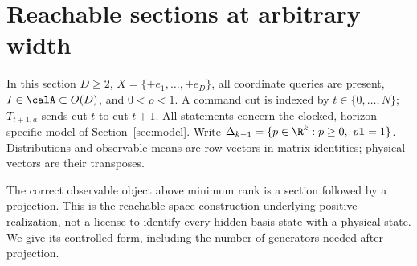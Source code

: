 \section{Reachable sections at arbitrary width}\label{sec:lifts51}
In this section $D\ge2$, $X=\{\pm e_1,\ldots,\pm e_D\}$, all
coordinate queries are present, $I\in\calA\subset O(D)$, and
$0<\rho<1$. A command cut is indexed by $t\in\{0,\ldots,N\}$;
$T_{t+1,a}$ sends cut $t$ to cut $t+1$. All statements concern the
clocked, horizon-specific model of Section~\ref{sec:model}.
Write $\Delta_{k-1}=\{p\in\R^k:p\ge0,\ p\mathbf1=1\}$.
Distributions and observable means are row vectors in matrix identities;
physical vectors are their transposes.

The correct observable object above minimum rank is a section followed
by a projection. This is the reachable-space construction underlying
positive realization, not a license to identify every hidden basis
state with a physical state. We give its controlled form, including the
number of generators needed after projection.

